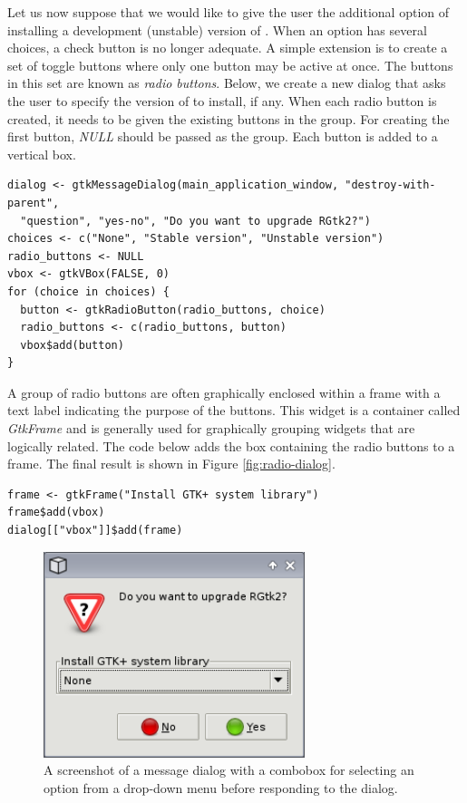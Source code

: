 \documentclass[article]{jss}
\begin{document}
Let us now suppose that we would like to give the user the additional option of
installing a development (unstable) version of .
When an option has several choices, a check button is no longer adequate. A
simple extension is to create a set of toggle buttons where only one button
may be active at once. The buttons in this set are known as \emph{radio buttons}.
Below, we create a new dialog that asks the user to specify the version of 
to install, if any. When each radio button is created, it needs to be given the existing buttons
in the group. For creating the first button, \emph{NULL} should be passed as the group.
Each button is added to a vertical box. 
\begin{verbatim}
dialog <- gtkMessageDialog(main_application_window, "destroy-with-parent", 
  "question", "yes-no", "Do you want to upgrade RGtk2?")
choices <- c("None", "Stable version", "Unstable version")
radio_buttons <- NULL
vbox <- gtkVBox(FALSE, 0)
for (choice in choices) {
  button <- gtkRadioButton(radio_buttons, choice)
  radio_buttons <- c(radio_buttons, button)
  vbox$add(button)
}
\end{verbatim}
A group of radio buttons are often graphically enclosed within a frame with
a text label indicating the purpose of the buttons. This widget is a container 
called \emph{GtkFrame} and is generally used for graphically grouping widgets that are
logically related. The code below adds the box containing the radio buttons
to a frame. The final result is shown in Figure \ref{fig:radio-dialog}.
\begin{verbatim}
frame <- gtkFrame("Install GTK+ system library")
frame$add(vbox)
dialog[["vbox"]]$add(frame)
\end{verbatim}

\begin{figure}
\begin{center}
\includegraphics[width=3in]{combo-dialog.png}
\caption{\label{fig:combo-dialog}A screenshot of a message dialog with a 
combobox for selecting an option from a drop-down menu before responding to
the dialog.}
\end{center}
\end{figure}
\end{document}
